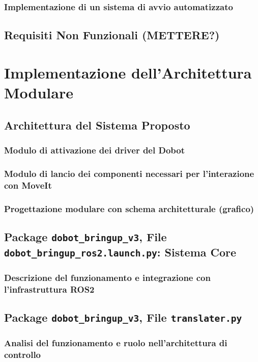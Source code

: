 \documentclass[12pt,a4paper,twoside,openright]{book}
\begin{document}
	\subsection{Implementazione di un sistema di avvio automatizzato}
	
	\section{Requisiti Non Funzionali (METTERE?)}
	
	
	\chapter{Implementazione dell'Architettura Modulare}
	\section{Architettura del Sistema Proposto}
	\subsection{Modulo di attivazione dei driver del Dobot}
	\subsection{Modulo di lancio dei componenti necessari per l'interazione con MoveIt}
	\subsection{Progettazione modulare con schema architetturale (grafico)}
	
	\section{Package \texttt{dobot\_bringup\_v3}, File \texttt{dobot\_bringup\_ros2.launch.py}: Sistema Core}
	\subsection{Descrizione del funzionamento e integrazione con l'infrastruttura ROS2}
	
	\section{Package \texttt{dobot\_bringup\_v3}, File \texttt{translater.py}}
	\subsection{Analisi del funzionamento e ruolo nell'architettura di controllo}
	
\end{document}
